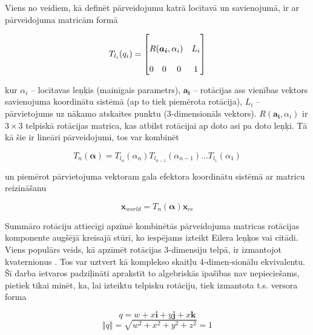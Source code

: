 \documentclass[12pt, a4paper]{article}
\numberwithin{equation}{section} %
\begin{document}
Viens no veidiem, kā definēt pārveidojumu katrā locītavā un savienojumā, ir ar pārveidojuma matricām formā

\begin{equation}
    T_{l_i}(q_i) =
    \begin{bmatrix}
        \multicolumn{3}{c}{\multirow{3}{*}{$R(\boldsymbol{a_i},\alpha_i)$}} & \multirow{3}{*}{$L_i$} \\
        \multicolumn{3}{c}{} & \multirow{3}{*}{} \\
        \multicolumn{3}{c}{} & \multirow{3}{*}{} \\
        0 & 0 & 0 & 1
    \end{bmatrix}
\end{equation}

kur $\alpha_i$ -- locītavas leņķis (mainīgais parametrs), $\boldsymbol{a_i}$ -- rotācijas ass vienības vektors savienojuma koordinātu sistēmā (ap to tiek piemērota rotācija), $L_i$ -- pārvietojums uz nākamo atskaites punktu (3-dimensionāls vektors). $R(\boldsymbol{a_i},\alpha_i)$ ir $3 \times 3$ telpiskā rotācijas matrica, kas atbilst rotācijai ap doto asi pa doto leņķi. Tā kā šie ir lineāri pārveidojumi, tos var kombinēt

\begin{equation}
    T_{n}(\boldsymbol{\alpha}) = T_{l_n}(\alpha_n)T_{l_{n-1}}(\alpha_{n-1})...T_{l_{1}}(\alpha_{1})
\end{equation}

un piemērot pārvietojuma vektoram gala efektora koordinātu sistēmā ar matricu reizināšanu

\begin{equation}
    \boldsymbol{x}_{world} = T_{n}(\boldsymbol{\alpha})\boldsymbol{x}_{ee}
\end{equation}

Summāro rotāciju attiecīgi apzīmē kombinētās pārveidojuma matricas rotācijas \newline komponente augšējā kreisajā stūrī, ko iespējams izteikt Eilera leņķos vai citādi. Viens populārs veids, kā apzīmēt rotācijas 3-dimensiju telpā, ir izmantojot kvaternionus \cite{quaternions_illinois}. Tos var uztvert kā komplekso skaitļu 4-dimen-sionālu ekvivalentu. Šī darba ietvaros padziļināti aprakstīt to algebriskās īpašības nav nepieciešams, pietiek tikai minēt, ka, lai izteiktu telpisku rotāciju, tiek izmantota t.s. versora forma

\begin{equation}
    q = w + x\boldsymbol{i} + y\boldsymbol{j} + x\boldsymbol{k}
\end{equation}
\begin{equation}
    \Vert q \Vert = \sqrt{w^2 + x^2 + y^2 + z^2} = 1
\end{equation}
\end{document}
